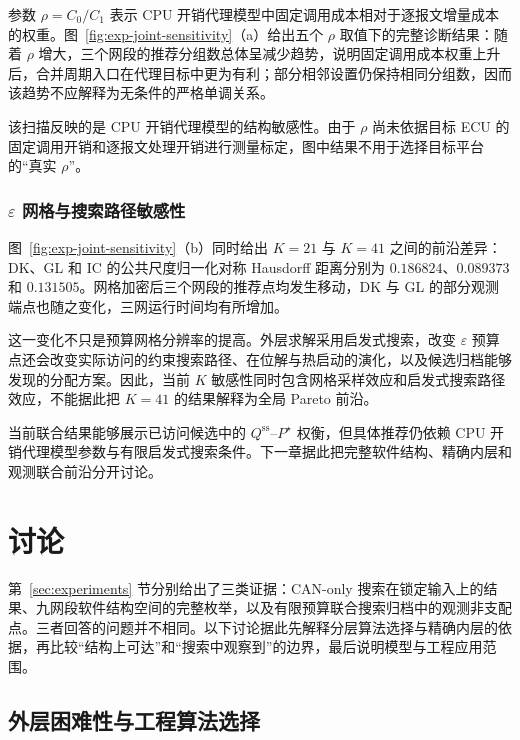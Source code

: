 \documentclass[UTF8,a4paper,twoside,zihao=-4]{ctexart}
\numberwithin{equation}{section}
\numberwithin{figure}{section}
\numberwithin{table}{section}
\theoremstyle{definition}
\numberwithin{algocf}{section}
\begin{document}
参数 $\rho=C_0/C_1$ 表示 CPU 开销代理模型中固定调用成本相对于逐报文增量成本的权重。图~\ref{fig:exp-joint-sensitivity}（a）给出五个 $\rho$ 取值下的完整诊断结果：随着 $\rho$ 增大，三个网段的推荐分组数总体呈减少趋势，说明固定调用成本权重上升后，合并周期入口在代理目标中更为有利；部分相邻设置仍保持相同分组数，因而该趋势不应解释为无条件的严格单调关系。

该扫描反映的是 CPU 开销代理模型的结构敏感性。由于 $\rho$ 尚未依据目标 ECU 的固定调用开销和逐报文处理开销进行测量标定，图中结果不用于选择目标平台的“真实 $\rho$”。

\subsubsection{\texorpdfstring{$\varepsilon$}{Epsilon} 网格与搜索路径敏感性}
\label{subsubsec:exp-rq7-grid}

图~\ref{fig:exp-joint-sensitivity}（b）同时给出 $K=21$ 与 $K=41$ 之间的前沿差异：DK、GL 和 IC 的公共尺度归一化对称 Hausdorff 距离分别为 $0.186824$、$0.089373$ 和 $0.131505$。网格加密后三个网段的推荐点均发生移动，DK 与 GL 的部分观测端点也随之变化，三网运行时间均有所增加。

这一变化不只是预算网格分辨率的提高。外层求解采用启发式搜索，改变 $\varepsilon$ 预算点还会改变实际访问的约束搜索路径、在位解与热启动的演化，以及候选归档能够发现的分配方案。因此，当前 $K$ 敏感性同时包含网格采样效应和启发式搜索路径效应，不能据此把 $K=41$ 的结果解释为全局 Pareto 前沿。

当前联合结果能够展示已访问候选中的 $Q^{\mathrm{ss}}$--$P^\star$ 权衡，但具体推荐仍依赖 CPU 开销代理模型参数与有限启发式搜索条件。下一章据此把完整软件结构、精确内层和观测联合前沿分开讨论。

\FloatBarrier

\clearpage

\section{讨论}
\label{sec:discussion}

第~\ref{sec:experiments} 节分别给出了三类证据：CAN-only 搜索在锁定输入上的结果、九网段软件结构空间的完整枚举，以及有限预算联合搜索归档中的观测非支配点。三者回答的问题并不相同。以下讨论据此先解释分层算法选择与精确内层的依据，再比较“结构上可达”和“搜索中观察到”的边界，最后说明模型与工程应用范围。

\subsection{外层困难性与工程算法选择}
\label{subsec:discussion-outer-choice}
\end{document}

